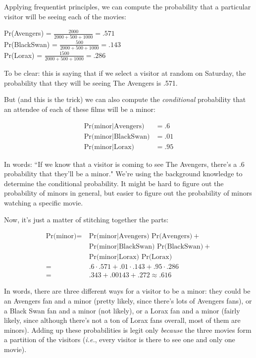 Applying frequentist principles, we can compute the probability that a
particular visitor will be seeing each of the movies:

\begin{center}
Pr(Avengers) = $\frac{2000}{2000+500+1000} = .571$ \\[.1in]
Pr(BlackSwan) = $\frac{500}{2000+500+1000} = .143$\\[.1in]
Pr(Lorax) = $\frac{1500}{2000+500+1000} = .286$
\end{center}

To be clear: this is saying that if we select a visitor at random on
Saturday, the probability that they will be seeing The Avengers is .571.

But (and this is the trick) we can also compute the \textit{conditional}
probability that an attendee of each of these films will be a minor:

\begin{align*}
\text{Pr(minor}|\text{Avengers)} &= .6 \\
\text{Pr(minor}|\text{BlackSwan)} &= .01 \\
\text{Pr(minor}|\text{Lorax)} &= .95
\end{align*}

In words: ``If we know that a visitor is coming to see The Avengers,
there's a .6 probability that they'll be a minor." We're using the
background knowledge to determine the conditional probability. It might be
hard to figure out the probability of minors in general, but easier to
figure out the probability of minors watching a specific movie.

Now, it's just a matter of stitching together the parts:

\begin{align*}
\text{Pr(minor)} = &\ \text{Pr(minor}|\text{Avengers) Pr(Avengers)} +  \\
&\ \text{Pr(minor}|\text{BlackSwan) Pr(BlackSwan)} +  \\
&\ \text{Pr(minor}|\text{Lorax) Pr(Lorax)}\\
= &\ .6 \cdot .571 + .01 \cdot .143 + .95 \cdot .286 \\
= &\ .343 + .00143 + .272 \approx .616
\end{align*}

In words, there are three different ways for a visitor to be a minor: they
could be an Avengers fan and a minor (pretty likely, since there's lots of
Avengers fans), or a Black Swan fan and a minor (not likely), or a Lorax
fan and a minor (fairly likely, since although there's not a ton of Lorax
fans overall, most of them are minors). Adding up these probabilities is
legit only \textit{because} the three movies form a partition of the
visitors (\textit{i.e.}, every visitor is there to see one and only one
movie).

